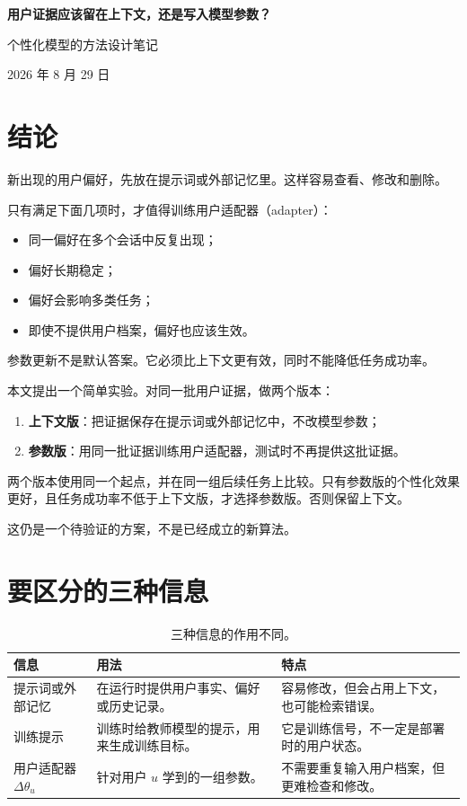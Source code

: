 \documentclass[11pt,UTF8,fontset=fandol]{ctexart}
\newcommand{\adapter}{\Delta\theta_u}
\begin{document}
\begin{center}
  {\LARGE\bfseries 用户证据应该留在上下文，还是写入模型参数？\par}
  \vspace{5pt}
  {\large 个性化模型的方法设计笔记\par}
  \vspace{4pt}
  {\small 2026 年 8 月 29 日}
\end{center}

\section{结论}

新出现的用户偏好，先放在提示词或外部记忆里。这样容易查看、修改和删除。

只有满足下面几项时，才值得训练用户适配器（adapter）：
\begin{itemize}
  \item 同一偏好在多个会话中反复出现；
  \item 偏好长期稳定；
  \item 偏好会影响多类任务；
  \item 即使不提供用户档案，偏好也应该生效。
\end{itemize}

参数更新不是默认答案。它必须比上下文更有效，同时不能降低任务成功率。

本文提出一个简单实验。对同一批用户证据，做两个版本：
\begin{enumerate}
  \item \textbf{上下文版}：把证据保存在提示词或外部记忆中，不改模型参数；
  \item \textbf{参数版}：用同一批证据训练用户适配器，测试时不再提供这批证据。
\end{enumerate}
两个版本使用同一个起点，并在同一组后续任务上比较。只有参数版的个性化效果更好，且任务成功率不低于上下文版，才选择参数版。否则保留上下文。

这仍是一个待验证的方案，不是已经成立的新算法。

\section{要区分的三种信息}

\begin{table}[ht]
  \centering
  \caption{三种信息的作用不同。}
  \begin{tabularx}{\textwidth}{@{}L{0.18\textwidth}L{0.35\textwidth}Y@{}}
    \toprule
    信息 & 用法 & 特点 \\
    \midrule
    提示词或外部记忆 &
    在运行时提供用户事实、偏好或历史记录。 &
    容易修改，但会占用上下文，也可能检索错误。 \\
    训练提示 &
    训练时给教师模型的提示，用来生成训练目标。 &
    它是训练信号，不一定是部署时的用户状态。 \\
    用户适配器 \(\adapter\) &
    针对用户 \(u\) 学到的一组参数。 &
    不需要重复输入用户档案，但更难检查和修改。 \\
    \bottomrule
  \end{tabularx}
\end{table}
\end{document}
